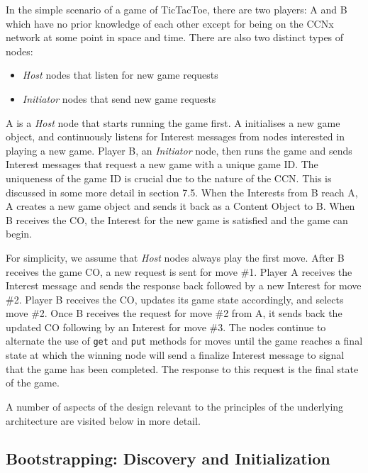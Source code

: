 \documentclass[a4paper,12pt]{report}      %
\begin{document}
In the simple scenario of a game of TicTacToe, there are two players: A and B which have no prior
knowledge of each other except for being on the CCNx network at some point in space and time. There
are also two distinct types of nodes: 
\begin{itemize}[(1)]
\item \emph{Host} nodes that listen for new game requests
\item \emph{Initiator} nodes that send new game requests 
\end{itemize}

A is a \emph{Host} node that starts running the game first. A initialises a new game object, and continuously
 listens for Interest messages from nodes interested in playing a new game. Player B, an \emph{Initiator} node, 
then runs the game and sends Interest messages that request a new game with a unique game ID. The uniqueness of the game ID is
crucial due to the nature of the CCN. This is discussed in some more detail in section 7.5. When the
Interests from B reach A, A creates a new game object and sends it back as a Content Object
to B. When B receives the CO, the Interest for the new game is satisfied and the game can begin.


For simplicity, we assume that \emph{Host} nodes always play the first move. After B receives the game CO, a
new request is sent for move \#1. Player A receives the Interest message and sends the response back
followed by a new Interest for move \#2. Player B receives the CO, updates its game state accordingly,
and selects move \#2. Once B receives the request for move \#2 from A, it sends back the updated CO following by an 
Interest for move \#3. The nodes continue to alternate the use of \verb!get! and \verb!put! methods for moves until
 the game reaches a final state at which the winning node will send a finalize Interest message to signal
 that the game has been completed. The response to this request is the final state of the game.

A number of aspects of the design relevant to the principles of the underlying architecture are visited below in more detail.

\subsection{Bootstrapping: Discovery and Initialization}
\end{document}
